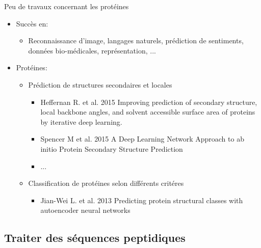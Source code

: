 \documentclass{beamer}
\begin{document}
\begin{frame}{Peu de travaux concernant les protéines}

      \begin{itemize}
      \item Succès en:\pause
        \begin{itemize}
        \item Reconnaissance d'image, langages naturels,
          prédiction de sentiments, données bio-médicales,
          représentation, ...\pause
        \end{itemize}
      \end{itemize}


      \begin{itemize}
      \item Protéines:
        \begin{itemize}
        \item Prédiction de structures secondaires et locales\pause
          \begin{itemize}
          \item Heffernan R. et al. 2015 Improving prediction of secondary
            structure, local backbone angles, and solvent accessible surface
            area of proteins by iterative deep learning. \pause
          \item Spencer M et al. 2015 A Deep Learning Network Approach to ab
            initio Protein Secondary Structure Prediction\pause
          \item ...\pause
          \end{itemize}
        \item Classification de protéines selon différents critéres\pause
          \begin{itemize}
          \item Jian-Wei L. et al. 2013 Predicting protein structural classes with autoencoder neural networks
          \end{itemize}
        \end{itemize}
      \end{itemize}


\end{frame}

\subsection{Traiter des séquences peptidiques}
\end{document}
